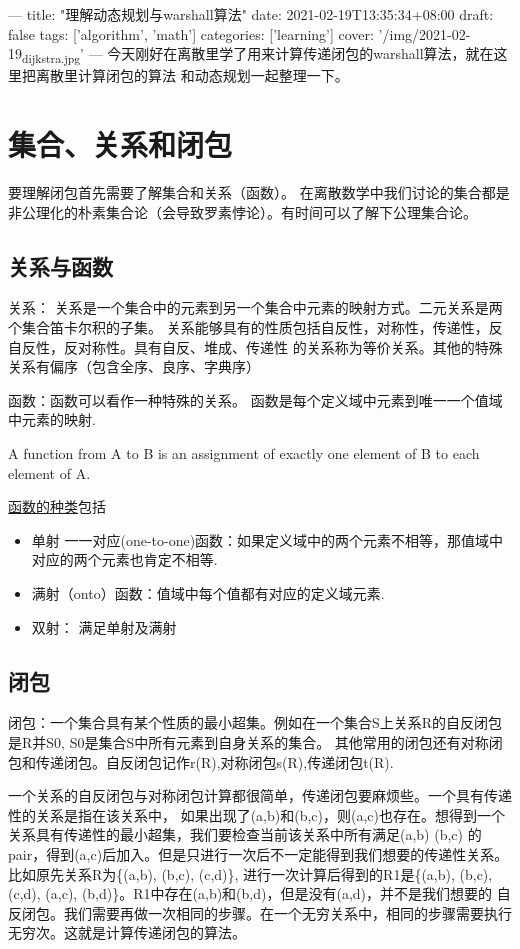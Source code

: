 \documentclass[11pt]{article}
\date{\today}
\title{}
\begin{document}
\tableofcontents

---
title: "理解动态规划与warshall算法"
date: 2021-02-19T13:35:34+08:00
draft: false
tags: ['algorithm', 'math']
categories: ['learning']
cover: '/img/2021-02-19\textsubscript{dijkstra.jpg}'
---
今天刚好在离散里学了用来计算传递闭包的warshall算法，就在这里把离散里计算闭包的算法
和动态规划一起整理一下。
\section{集合、关系和闭包}
\label{sec:org7981eda}
要理解闭包首先需要了解集合和关系（函数）。
在离散数学中我们讨论的集合都是非公理化的朴素集合论（会导致罗素悖论）。有时间可以了解下公理集合论。
\subsection{关系与函数}
\label{sec:org111e7d9}
关系： 关系是一个集合中的元素到另一个集合中元素的映射方式。二元关系是两个集合笛卡尔积的子集。
关系能够具有的性质包括自反性，对称性，传递性，反自反性，反对称性。具有自反、堆成、传递性
的关系称为等价关系。其他的特殊关系有偏序（包含全序、良序、字典序）

函数：函数可以看作一种特殊的关系。
函数是每个定义域中元素到唯一一个值域中元素的映射.

A function from A to B is an assignment of exactly one element
of B to each element of A.

\href{https://www.shuxuele.com/sets/injective-surjective-bijective.html}{函数的种类}包括
\begin{itemize}
\item 单射 一一对应(one-to-one)函数：如果定义域中的两个元素不相等，那值域中对应的两个元素也肯定不相等.
\item 满射（onto）函数：值域中每个值都有对应的定义域元素.
\item 双射： 满足单射及满射
\end{itemize}
\subsection{闭包}
\label{sec:org9db1458}
闭包：一个集合具有某个性质的最小超集。例如在一个集合S上关系R的自反闭包是R并S0, S0是集合S中所有元素到自身关系的集合。
其他常用的闭包还有对称闭包和传递闭包。自反闭包记作r(R),对称闭包s(R),传递闭包t(R).

一个关系的自反闭包与对称闭包计算都很简单，传递闭包要麻烦些。一个具有传递性的关系是指在该关系中，
如果出现了(a,b)和(b,c)，则(a,c)也存在。想得到一个关系具有传递性的最小超集，我们要检查当前该关系中所有满足(a,b) (b,c)
的pair，得到(a,c)后加入。但是只进行一次后不一定能得到我们想要的传递性关系。比如原先关系R为\{(a,b), (b,c), (c,d)\},
进行一次计算后得到的R1是\{(a,b), (b,c), (c,d), (a,c), (b,d)\}。R1中存在(a,b)和(b,d)，但是没有(a,d)，并不是我们想要的
自反闭包。我们需要再做一次相同的步骤。在一个无穷关系中，相同的步骤需要执行无穷次。这就是计算传递闭包的算法。
\end{document}
